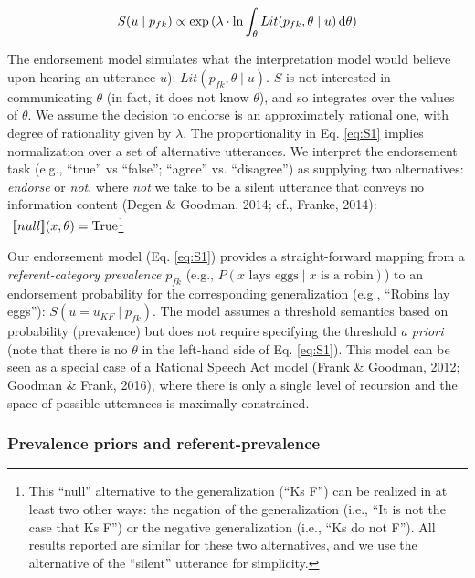 \documentclass[english,floatsintext,man]{apa6}
\theoremstyle{definition}
\theoremstyle{definition}
\theoremstyle{definition}
\theoremstyle{remark}
\begin{document}
\begin{equation} 
S(u \mid p_{fk}) \propto \exp{(\lambda \cdot \ln{ \int_{\theta} Lit(p_{fk}, \theta \mid u)  \mathop{}\!\mathrm{d}\theta } )}
\label{eq:S1}
\end{equation}

The endorsement model simulates what the interpretation model would
believe upon hearing an utterance \(u\)):
\(Lit(p_{fk}, \theta \mid u)\). \(S\) is not interested in communicating
\(\theta\) (in fact, it does not know \(\theta\)), and so integrates
over the values of \(\theta\). We assume the decision to endorse is an
approximately rational one, with degree of rationality given by
\(\lambda\). The proportionality in Eq. \ref{eq:S1} implies
normalization over a set of alternative utterances. We interpret the
endorsement task (e.g., \enquote{true} vs \enquote{false};
\enquote{agree} vs. \enquote{disagree}) as supplying two alternatives:
\emph{endorse} or \emph{not}, where \emph{not} we take to be a silent
utterance that conveys no information content (Degen \& Goodman, 2014;
cf., Franke, 2014): \(\mbox{ $[\![ null ]\!]$}(x, \theta) = \text{True}\)\footnote{This
  \enquote{null} alternative to the generalization (\enquote{Ks F}) can
  be realized in at least two other ways: the negation of the
  generalization (i.e., \enquote{It is not the case that Ks F}) or the
  negative generalization (i.e., \enquote{Ks do not F}). All results
  reported are similar for these two alternatives, and we use the
  alternative of the \enquote{silent} utterance for simplicity.}

Our endorsement model (Eq. \ref{eq:S1}) provides a straight-forward
mapping from a \emph{referent-category prevalence} \(p_{fk}\) (e.g.,
\(P(x \text{ lays eggs} \mid x \text{ is a robin})\)) to an endorsement
probability for the corresponding generalization (e.g., \enquote{Robins
lay eggs}): \(S(u = u_{KF} \mid p_{fk})\). The model assumes a threshold
semantics based on probability (prevalence) but does not require
specifying the threshold \emph{a priori} (note that there is no
\(\theta\) in the left-hand side of Eq. \ref{eq:S1}). This model can be
seen as a special case of a Rational Speech Act model (Frank \& Goodman,
2012; Goodman \& Frank, 2016), where there is only a single level of
recursion and the space of possible utterances is maximally constrained.

\subsubsection{Prevalence priors and
referent-prevalence}\label{prevalence-priors-and-referent-prevalence}
\end{document}
